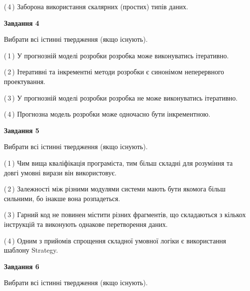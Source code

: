 \documentclass[10pt, ukrainian]{article}
\begin{document}
{\begin {large}
(\,4\,) Заборона використання скалярних (простих) типів даних. %


{\begin {center}\textbf{Завдання 4}\end {center}}\par
Вибрати всі істинні твердження (якщо існують).\par
\vspace{2mm}



(\,1\,) У прогнозній моделі розробки розробка може виконуватись ітеративно. %



(\,2\,) Ітеративні та інкрементні методи розробки є синонімом неперервного проектування. %



(\,3\,) У прогнозній моделі розробки розробка не може виконуватись ітеративно. %



(\,4\,) Прогнозна модель розробки може одночасно бути інкрементною. %


{\begin {center}\textbf{Завдання 5}\end {center}}\par
Вибрати всі істинні твердження (якщо існують).\par
\vspace{2mm}



(\,1\,) Чим вища кваліфікація програміста, тим більш складні для розуміння та довгі умовні вирази він використовує. %



(\,2\,) Залежності між різними модулями системи мають бути якомога більш сильними, бо інакше вона розпадеться. %



(\,3\,) Гарний код не повинен містити різних фрагментів, що складаються з кількох інструкцій та виконують однакове перетворення даних. %



(\,4\,) Одним з прийомів спрощення складної умовної логіки є використання шаблону Strategy. %

\newpage

{\begin {center}\textbf{Завдання 6}\end {center}}\par
Вибрати всі істинні твердження (якщо існують).\par
\vspace{2mm}




\end{large}}
\end{document}
